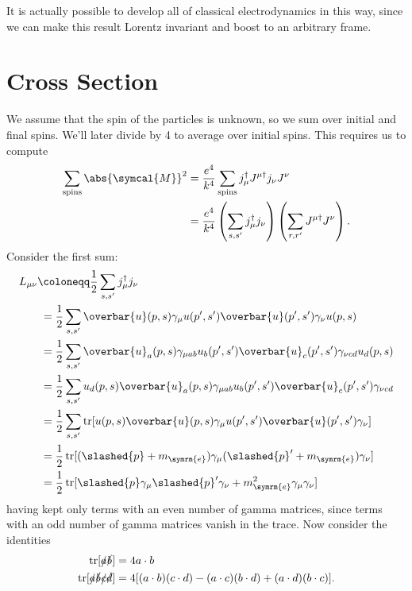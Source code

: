 \documentclass[fleqn]{NotesClass}
\newcommand{\hermit}{{\dagger}}
\newcommand{\amplitude}{\symcal{M}}
\DeclareMathOperator{\tr}{tr}
\newcommand{\diracadjoint}[1]{\overbar{#1}}
\begin{document}
    It is actually possible to develop all of classical electrodynamics in this way, since we can make this result Lorentz invariant and boost to an arbitrary frame.
    
    \section{Cross Section}
    We assume that the spin of the particles is unknown, so we sum over initial and final spins.
    We'll later divide by 4 to average over initial spins.
    This requires us to compute
    \begin{align}
        \sum_{\text{spins}} \abs{\amplitude}^2 &= \frac{e^4}{k^4} \sum_{\text{spins}} j_\mu^\hermit J^{\mu\hermit} j_\nu J^\nu\\
        &= \frac{e^4}{k^4} \left( \sum_{s, s'} j_\mu^\hermit j_\nu \right) \left( \sum_{r, r'} J^{\mu\hermit} J^\nu \right).
    \end{align}
    Consider the first sum:
    \begingroup
    \allowdisplaybreaks
    \begin{align}
        L_{\mu\nu} &\coloneqq \frac{1}{2} \sum_{s, s'} j_\mu^\hermit j_\nu\\
        &\hphantom{:}= \frac{1}{2} \sum_{s, s'} \diracadjoint{u}(p, s) \gamma_\mu u(p', s') \diracadjoint{u}(p', s') \gamma_\nu u(p, s)\\
        &\hphantom{:}= \frac{1}{2} \sum_{s, s'} \diracadjoint{u}_{a}(p, s) \gamma_{\mu ab} u_b(p', s') \diracadjoint{u}_c(p', s') \gamma_{\nu cd} u_d(p, s)\\
        &\hphantom{:}= \frac{1}{2} \sum_{s, s'} u_d(p, s) \diracadjoint{u}_{a}(p, s) \gamma_{\mu ab} u_b(p', s') \diracadjoint{u}_c(p', s') \gamma_{\nu cd}\\
        &\hphantom{:}= \frac{1}{2} \sum_{s, s'} \tr[u(p, s) \diracadjoint{u}(p, s) \gamma_\mu u(p', s') \diracadjoint{u}(p', s') \gamma_\nu]\\
        &\hphantom{:}= \frac{1}{2} \tr[(\slashed{p} + m_{\symrm{e}}) \gamma_\mu (\slashed{p}' + m_{\symrm{e}}) \gamma_\nu]\\
        &\hphantom{:}= \frac{1}{2} \tr[\slashed{p}\gamma_\mu \slashed{p}' \gamma_\nu + m_{\symrm{e}}^2\gamma_\mu \gamma_\nu]
    \end{align}
    having kept only terms with an even number of gamma matrices, since terms with an odd number of gamma matrices vanish in the trace.
    \endgroup
    Now consider the identities
    \begin{align}
        \tr[\slashed{a}\slashed{b}] &= 4 a \cdot b\\
        \tr[\slashed{a}\slashed{b}\slashed{c}\slashed{d}] &= 4[(a\cdot b)(c \cdot d) - (a \cdot c)(b \cdot d) + (a \cdot d)(b \cdot c)].
    \end{align}
\end{document}
